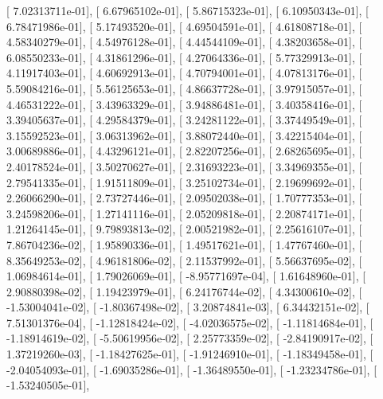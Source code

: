 \documentclass{article}
\begin{document}
       [  7.02313711e-01],
       [  6.67965102e-01],
       [  5.86715323e-01],
       [  6.10950343e-01],
       [  6.78471986e-01],
       [  5.17493520e-01],
       [  4.69504591e-01],
       [  4.61808718e-01],
       [  4.58340279e-01],
       [  4.54976128e-01],
       [  4.44544109e-01],
       [  4.38203658e-01],
       [  6.08550233e-01],
       [  4.31861296e-01],
       [  4.27064336e-01],
       [  5.77329913e-01],
       [  4.11917403e-01],
       [  4.60692913e-01],
       [  4.70794001e-01],
       [  4.07813176e-01],
       [  5.59084216e-01],
       [  5.56125653e-01],
       [  4.86637728e-01],
       [  3.97915057e-01],
       [  4.46531222e-01],
       [  3.43963329e-01],
       [  3.94886481e-01],
       [  3.40358416e-01],
       [  3.39405637e-01],
       [  4.29584379e-01],
       [  3.24281122e-01],
       [  3.37449549e-01],
       [  3.15592523e-01],
       [  3.06313962e-01],
       [  3.88072440e-01],
       [  3.42215404e-01],
       [  3.00689886e-01],
       [  4.43296121e-01],
       [  2.82207256e-01],
       [  2.68265695e-01],
       [  2.40178524e-01],
       [  3.50270627e-01],
       [  2.31693223e-01],
       [  3.34969355e-01],
       [  2.79541335e-01],
       [  1.91511809e-01],
       [  3.25102734e-01],
       [  2.19699692e-01],
       [  2.26066290e-01],
       [  2.73727446e-01],
       [  2.09502038e-01],
       [  1.70777353e-01],
       [  3.24598206e-01],
       [  1.27141116e-01],
       [  2.05209818e-01],
       [  2.20874171e-01],
       [  1.21264145e-01],
       [  9.79893813e-02],
       [  2.00521982e-01],
       [  2.25616107e-01],
       [  7.86704236e-02],
       [  1.95890336e-01],
       [  1.49517621e-01],
       [  1.47767460e-01],
       [  8.35649253e-02],
       [  4.96181806e-02],
       [  2.11537992e-01],
       [  5.56637695e-02],
       [  1.06984614e-01],
       [  1.79026069e-01],
       [ -8.95771697e-04],
       [  1.61648960e-01],
       [  2.90880398e-02],
       [  1.19423979e-01],
       [  6.24176744e-02],
       [  4.34300610e-02],
       [ -1.53004041e-02],
       [ -1.80367498e-02],
       [  3.20874841e-03],
       [  6.34432151e-02],
       [  7.51301376e-04],
       [ -1.12818424e-02],
       [ -4.02036575e-02],
       [ -1.11814684e-01],
       [ -1.18914619e-02],
       [ -5.50619956e-02],
       [  2.25773359e-02],
       [ -2.84190917e-02],
       [  1.37219260e-03],
       [ -1.18427625e-01],
       [ -1.91246910e-01],
       [ -1.18349458e-01],
       [ -2.04054093e-01],
       [ -1.69035286e-01],
       [ -1.36489550e-01],
       [ -1.23234786e-01],
       [ -1.53240505e-01],
\end{document}
